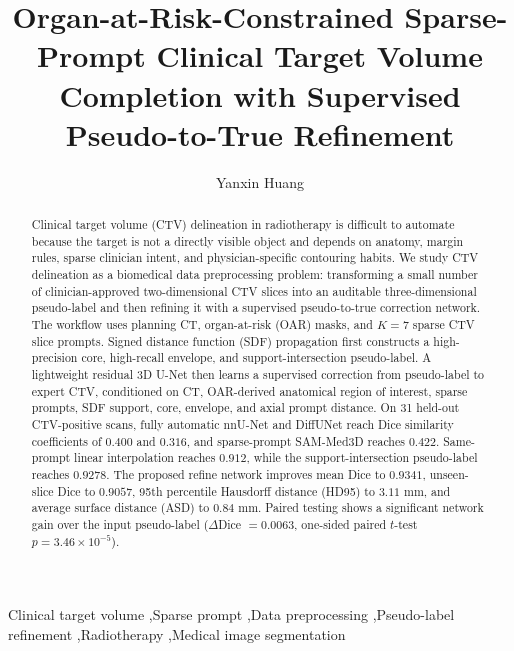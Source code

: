 \documentclass[preprint,12pt]{elsarticle}
\begin{document}


\begin{frontmatter}

\title{Organ-at-Risk-Constrained Sparse-Prompt Clinical Target Volume Completion with Supervised Pseudo-to-True Refinement}

\author[inst1]{Yanxin Huang}


\begin{abstract}
Clinical target volume (CTV) delineation in radiotherapy is difficult to automate because the target is not a directly visible object and depends on anatomy, margin rules, sparse clinician intent, and physician-specific contouring habits. We study CTV delineation as a biomedical data preprocessing problem: transforming a small number of clinician-approved two-dimensional CTV slices into an auditable three-dimensional pseudo-label and then refining it with a supervised pseudo-to-true correction network. The workflow uses planning CT, organ-at-risk (OAR) masks, and $K=7$ sparse CTV slice prompts. Signed distance function (SDF) propagation first constructs a high-precision core, high-recall envelope, and support-intersection pseudo-label. A lightweight residual 3D U-Net then learns a supervised correction from pseudo-label to expert CTV, conditioned on CT, OAR-derived anatomical region of interest, sparse prompts, SDF support, core, envelope, and axial prompt distance. On 31 held-out CTV-positive scans, fully automatic nnU-Net and DiffUNet reach Dice similarity coefficients of $0.400$ and $0.316$, and sparse-prompt SAM-Med3D reaches $0.422$. Same-prompt linear interpolation reaches $0.912$, while the support-intersection pseudo-label reaches $0.9278$. The proposed refine network improves mean Dice to $0.9341$, unseen-slice Dice to $0.9057$, 95th percentile Hausdorff distance (HD95) to $3.11$ mm, and average surface distance (ASD) to $0.84$ mm. Paired testing shows a significant network gain over the input pseudo-label ($\Delta$Dice $=0.0063$, one-sided paired $t$-test $p=3.46\times10^{-5}$).
\end{abstract}

\begin{keyword}
Clinical target volume \sep Sparse prompt \sep Data preprocessing \sep Pseudo-label refinement \sep Radiotherapy \sep Medical image segmentation
\end{keyword}

\end{frontmatter}
\end{document}
